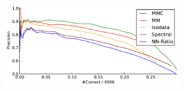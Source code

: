 \documentclass[12pt,journal,compsoc]{IEEEtran}
\begin{document}
\begin{figure}
{\begin{subfigure}[t]{.27\textwidth}
			\centering
			\includegraphics[width=\textwidth]{images/result_graf}
		\end{subfigure}%
	}%

\end{figure}
\end{document}
